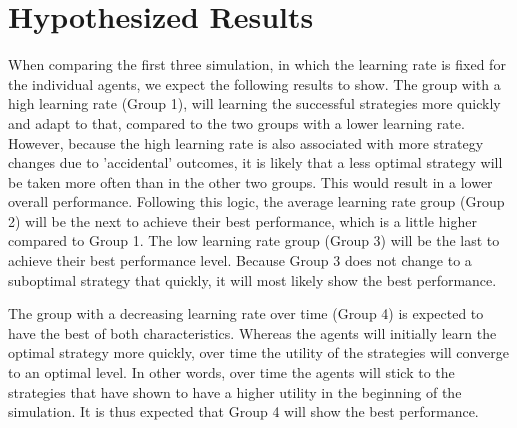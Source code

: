 \section{Hypothesized Results}
When comparing the first three simulation, in which the learning rate is fixed for the individual agents, we expect the following results to show. The group with a high learning rate (Group 1), will learning the successful strategies more quickly and adapt to that, compared to the two groups with a lower learning rate. However, because the high learning rate is also associated with more strategy changes due to 'accidental' outcomes, it is likely that a less optimal strategy will be taken more often than in the other two groups. This would result in a lower overall performance. Following this logic, the average learning rate group (Group 2) will be the next to achieve their best performance, which is a little higher compared to Group 1. The low learning rate group (Group 3) will be the last to achieve their best performance level. Because Group 3 does not change to a suboptimal strategy that quickly, it will most likely show the best performance. 

The group with a decreasing learning rate over time (Group 4) is expected to have the best of both characteristics. Whereas the agents will initially learn the optimal strategy more quickly, over time the utility of the strategies will converge to an optimal level. In other words, over time the agents will stick to the strategies that have shown to have a higher utility in the beginning of the simulation. It is thus expected that Group 4 will show the best performance. 